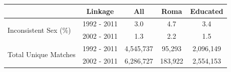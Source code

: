 \begin{tabular}{lcccc}
\hline
& Linkage & All & Roma & Educated \\
\hline
\multirow{2}{*}{Inconsistent Sex (\%)} & 1992 - 2011 & 3.0 & 4.7 & 3.4 \\
& 2002 - 2011 & 1.3 & 2.2 & 1.5 \\
\midrule
\multirow{2}{*}{Total Unique Matches} & 1992 - 2011 & 4,545,737 & 95,293 & 2,096,149 \\
& 2002 - 2011 & 6,286,727 & 183,922 & 2,554,153 \\
\hline
\end{tabular}
